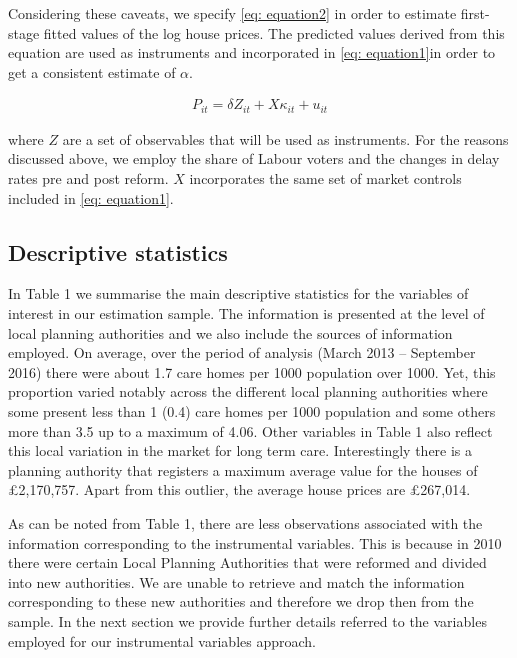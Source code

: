 \documentclass[12pt,letterpaper]{article}
\begin{document}
Considering these caveats, we specify \ref{eq: equation2} in order to estimate first-stage fitted values of the log
 house prices. The predicted values derived from this equation are used as instruments and incorporated in
 \ref{eq: equation1}in order to get a consistent estimate of $\alpha$.
 
  \begin{eqnarray}
\label{eq: equation2}
   P_{it} = \delta Z_{it} + X\kappa_{it} + u_{it}
 \end{eqnarray}

where $Z$ are a set of observables that will be used as instruments. 
For the reasons discussed above, we employ the share of Labour voters and the 
changes in delay rates pre and post reform.  $X$ incorporates the same set of market controls included in \ref{eq: equation1}.

\subsection{Descriptive statistics}

In Table 1 we summarise the main descriptive statistics for the variables of interest in our estimation sample. 
The information is presented at the level of local planning authorities and we also include the sources of 
information employed. On average, over the period of analysis (March 2013 – September 2016) 
there were about 1.7 care homes per 1000 population over 1000. Yet, this proportion varied notably 
across the different local planning authorities where some present less than 1 (0.4) care homes 
per 1000 population and some others more than 3.5 up to a maximum of 4.06. Other variables
 in Table 1 also reflect this local variation in the market for long term care. Interestingly there 
 is a planning authority that registers a maximum average value for the houses of £2,170,757. 
 Apart from this outlier, the average house prices are £267,014.
 
 As can be noted from Table 1, there are less observations associated with the information
  corresponding to the instrumental variables. This is because in 2010 there were certain
   Local Planning Authorities that were reformed and divided into new authorities.
    We are unable to retrieve and match the information corresponding to these new 
    authorities and therefore we drop then from the sample. In the next section we provide
  further details referred to the variables employed for our instrumental variables approach. 
  
\end{document}
